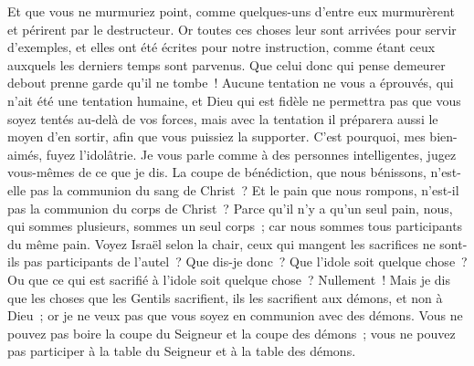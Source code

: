\begin{multicols}{2}
Et que vous ne murmuriez point, comme quelques-uns d'entre eux murmurèrent et périrent par le destructeur.
Or toutes ces choses leur sont arrivées pour servir d'exemples, et elles ont été écrites pour notre instruction, comme étant ceux auxquels les derniers temps sont parvenus.
Que celui donc qui pense demeurer debout prenne garde qu'il ne tombe~!
Aucune tentation ne vous a éprouvés, qui n'ait été une tentation humaine, et Dieu qui est fidèle ne permettra pas que vous soyez tentés au-delà de vos forces, mais avec la tentation il préparera aussi le moyen d'en sortir, afin que vous puissiez la supporter.
C'est pourquoi, mes bien-aimés, fuyez l'idolâtrie.
Je vous parle comme à des personnes intelligentes, jugez vous-mêmes de ce que je dis.
La coupe de bénédiction, que nous bénissons, n'est-elle pas la communion du sang de Christ~? Et le pain que nous rompons, n'est-il pas la communion du corps de Christ~?
Parce qu'il n'y a qu'un seul pain, nous, qui sommes plusieurs, sommes un seul corps~; car nous sommes tous participants du même pain.
Voyez Israël selon la chair, ceux qui mangent les sacrifices ne sont-ils pas participants de l'autel~?
Que dis-je donc~? Que l'idole soit quelque chose~? Ou que ce qui est sacrifié à l'idole soit quelque chose~? Nullement~!
Mais je dis que les choses que les Gentils sacrifient, ils les sacrifient aux démons, et non à Dieu~; or je ne veux pas que vous soyez en communion avec des démons.
Vous ne pouvez pas boire la coupe du Seigneur et la coupe des démons~; vous ne pouvez pas participer à la table du Seigneur et à la table des démons.

\end{multicols}
